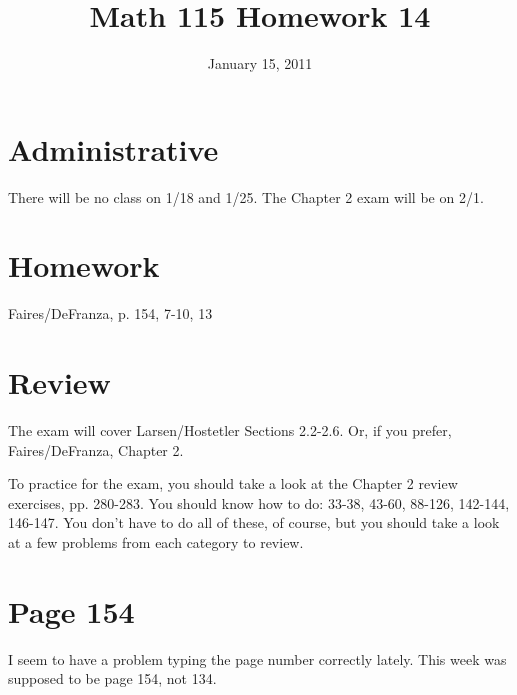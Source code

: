 \documentclass[fleqn,addpoints]{exam}
\title{Math 115 Homework 14}
\date{January 15, 2011}
\begin{document}
\maketitle

\section{Administrative}

There will be no class on 1/18 and 1/25.  The Chapter 2 exam will be on 2/1. 

\section{Homework}
Faires/DeFranza, p. 154, 7-10, 13

\ifprintanswers
\else
\section{Review}
The exam will cover Larsen/Hostetler Sections 2.2-2.6.  Or, if you prefer, Faires/DeFranza, Chapter 2.

To practice for the exam, you should take a look at the Chapter 2 review exercises, pp. 280-283.  You should know how to
do: 33-38, 43-60, 88-126, 142-144, 146-147.  You don't have to do all of these, of course, but you should take a look at
a few problems from each category to review.
\fi

\section{Page 154}

I seem to have a problem typing the page number correctly lately.  This week was supposed to be page 154, not 134.
\end{document}
